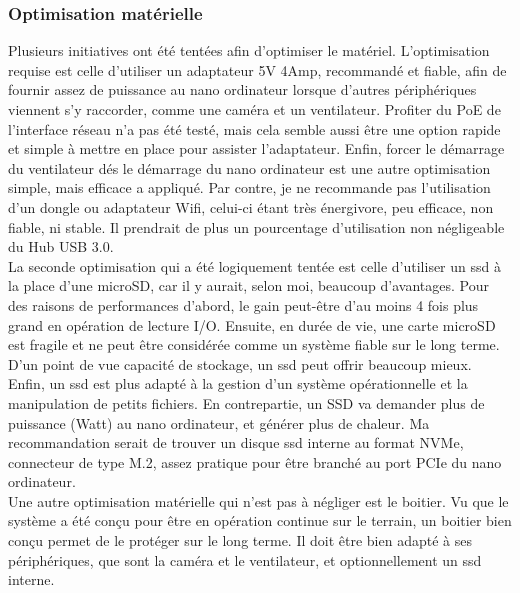 \subsubsection{Optimisation matérielle}
\noindent Plusieurs initiatives ont été tentées afin d'optimiser le matériel. L'optimisation requise est celle d'utiliser un adaptateur 5V 4Amp, recommandé et fiable, afin de fournir assez de puissance au nano ordinateur lorsque d'autres périphériques viennent s'y raccorder, comme une caméra et un ventilateur. Profiter du PoE de l'interface réseau n'a pas été testé, mais cela semble aussi être une option rapide et simple à mettre en place pour assister l'adaptateur. Enfin, forcer le démarrage du ventilateur dés le démarrage du nano ordinateur est une autre optimisation simple, mais efficace a appliqué. Par contre, je ne recommande pas l'utilisation d'un dongle ou adaptateur Wifi, celui-ci étant très énergivore, peu efficace, non fiable, ni stable. Il prendrait de plus un pourcentage d'utilisation non négligeable du Hub USB 3.0. 
\vspace{\baselineskip}
\\
\noindent La seconde optimisation qui a été logiquement tentée est celle d'utiliser un \acrshort{ssd} à la place d'une microSD, car il y aurait, selon moi, beaucoup d'avantages. Pour des raisons de performances d'abord, le gain peut-être d'au moins 4 fois plus grand en opération de lecture I/O. Ensuite, en durée de vie, une carte microSD est fragile et ne peut être considérée comme un système fiable sur le long terme. D'un point de vue capacité de stockage, un \acrshort{ssd} peut offrir beaucoup mieux. Enfin, un \acrshort{ssd} est plus adapté à la gestion d'un système opérationnelle et la manipulation de petits fichiers. En contrepartie, un SSD va demander plus de puissance (Watt) au nano ordinateur, et générer plus de chaleur. Ma recommandation serait de trouver un disque \acrshort{ssd} interne au format NVMe, connecteur de type M.2, assez pratique pour être branché au port PCIe du nano ordinateur.
\vspace{\baselineskip}
\\
\noindent Une autre optimisation matérielle qui n'est pas à négliger est le boitier. Vu que le système a été conçu pour être en opération continue sur le terrain, un boitier bien conçu permet de le protéger sur le long terme. Il doit être bien adapté à ses périphériques, que sont la caméra et le ventilateur, et optionnellement un \acrshort{ssd} interne.
